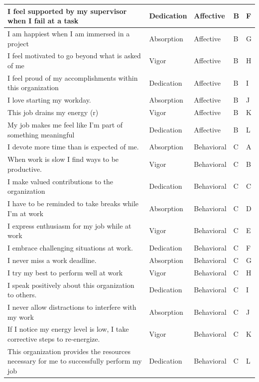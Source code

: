 \documentclass[
]{book}
\begin{document}
\begin{table}
\begin{tabular}[t]{l|l|l|l|l}
\hline
I feel supported by my supervisor when I fail at a task & Dedication & Affective & B & F\\
\hline
I am happiest when I am immersed in a project & Absorption & Affective & B & G\\
\hline
I feel motivated to go beyond what is asked of me & Vigor & Affective & B & H\\
\hline
I feel proud of my accomplishments within this organization & Dedication & Affective & B & I\\
\hline
I love starting my workday. & Absorption & Affective & B & J\\
\hline
This job drains my energy (r) & Vigor & Affective & B & K\\
\hline
My job makes me feel like I’m part of something meaningful & Dedication & Affective & B & L\\
\hline
I devote more time than is expected of me. & Absorption & Behavioral & C & A\\
\hline
When work is slow I find ways to be productive. & Vigor & Behavioral & C & B\\
\hline
I make valued contributions to the organization & Dedication & Behavioral & C & C\\
\hline
I have to be reminded to take breaks while I’m at work & Absorption & Behavioral & C & D\\
\hline
I express enthusiasm for my job while at work & Vigor & Behavioral & C & E\\
\hline
I embrace challenging situations at work. & Dedication & Behavioral & C & F\\
\hline
I never miss a work deadline. & Absorption & Behavioral & C & G\\
\hline
I try my best to perform well at work & Vigor & Behavioral & C & H\\
\hline
I speak positively about this organization to others. & Dedication & Behavioral & C & I\\
\hline
I never allow distractions to interfere with my work & Absorption & Behavioral & C & J\\
\hline
If I notice my energy level is low, I take corrective steps to re-energize. & Vigor & Behavioral & C & K\\
\hline
This organization provides the resources necessary for me to successfully perform my job & Dedication & Behavioral & C & L\\
\hline
\end{tabular}
\end{table}
\end{document}
